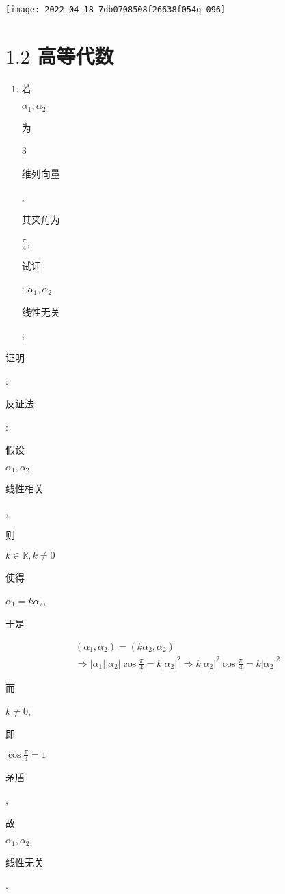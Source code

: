 \documentclass[10pt]{article}
\begin{document}
\texttt{[image: 2022\_04\_18\_7db0708508f26638f054g-096]}

\section{$1.2$ 高等代数}
\begin{enumerate}
  \item \begin{CJK}{UTF8}{mj}若\end{CJK} $\alpha_{1}, \alpha_{2}$ \begin{CJK}{UTF8}{mj}为\end{CJK} 3 \begin{CJK}{UTF8}{mj}维列向量\end{CJK}, \begin{CJK}{UTF8}{mj}其夹角为\end{CJK} $\frac{\pi}{4}$, \begin{CJK}{UTF8}{mj}试证\end{CJK}: $\alpha_{1}, \alpha_{2}$ \begin{CJK}{UTF8}{mj}线性无关\end{CJK};
\end{enumerate}
\begin{CJK}{UTF8}{mj}证明\end{CJK}: \begin{CJK}{UTF8}{mj}反证法\end{CJK}: \begin{CJK}{UTF8}{mj}假设\end{CJK} $\alpha_{1}, \alpha_{2}$ \begin{CJK}{UTF8}{mj}线性相关\end{CJK}, \begin{CJK}{UTF8}{mj}则\end{CJK} $k \in \mathbb{R}, k \neq 0$ \begin{CJK}{UTF8}{mj}使得\end{CJK} $\alpha_{1}=k \alpha_{2}$, \begin{CJK}{UTF8}{mj}于是\end{CJK}
$$
\begin{gathered}
\left(\alpha_{1}, \alpha_{2}\right)=\left(k \alpha_{2}, \alpha_{2}\right) \\
\Rightarrow\left|\alpha_{1}\right|\left|\alpha_{2}\right| \cos \frac{\pi}{4}=k\left|\alpha_{2}\right|^{2} \Rightarrow k\left|\alpha_{2}\right|^{2} \cos \frac{\pi}{4}=k\left|\alpha_{2}\right|^{2}
\end{gathered}
$$
\begin{CJK}{UTF8}{mj}而\end{CJK} $k \neq 0$, \begin{CJK}{UTF8}{mj}即\end{CJK} $\cos \frac{\pi}{4}=1$ \begin{CJK}{UTF8}{mj}矛盾\end{CJK}, \begin{CJK}{UTF8}{mj}故\end{CJK} $\alpha_{1}, \alpha_{2}$ \begin{CJK}{UTF8}{mj}线性无关\end{CJK}.
\end{document}
